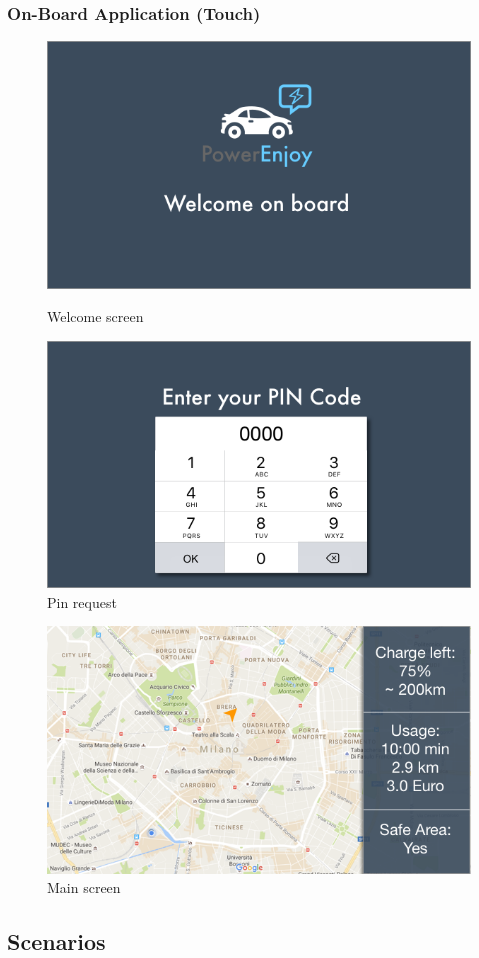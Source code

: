\documentclass[12pt]{article}
\begin{document}
 	 \subsubsection{On-Board Application (Touch)}
 	 	 \begin{figure}
		 \centering	
		\vspace{-17cm}		 
		 \includegraphics[scale=0.6]{Images/onBoard/Welcome.png}
		 \caption{Welcome screen}
		 \centering
 	 	  \includegraphics[scale=0.6]{Images/onBoard/Pin.png}
		  \caption{Pin request}
 	 	\end{figure}
 	 	 
 	 	\begin{figure}
		 \centering	
		 \includegraphics[scale=0.6]{Images/onBoard/Main.png}
		 \caption{Main screen}
 	 	\end{figure}
 	 	
 	   \FloatBarrier
 	 	\subsection{Scenarios}
 	
 	 	
 	 	
 	 

 	 	
		
	 	 
\end{document}

